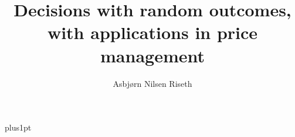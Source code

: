 \documentclass[12pt,fleqn]{infommthesis}
\title{Decisions with random outcomes, with applications in price management}
\author{Asbj{\o}rn Nilsen Riseth}
\def\biblio{}
\begin{document}
\def\biblio{} %

\baselineskip=18pt plus1pt

\setcounter{secnumdepth}{3}
\setcounter{tocdepth}{3}


\maketitle                  %
\begin{dedication}
\end{dedication}

\begin{acknowledgementslong}
\end{acknowledgementslong}

\begin{abstractseparate}
\end{abstractseparate}

\begin{originalitylong}
  
\end{originalitylong}

\begin{romanpages}          %
  \listoftodos[Notes]
  \tableofcontents            %
  \listoffigures              %
  \listoftables               %
\end{romanpages}            %












\appendix



\end{document}

